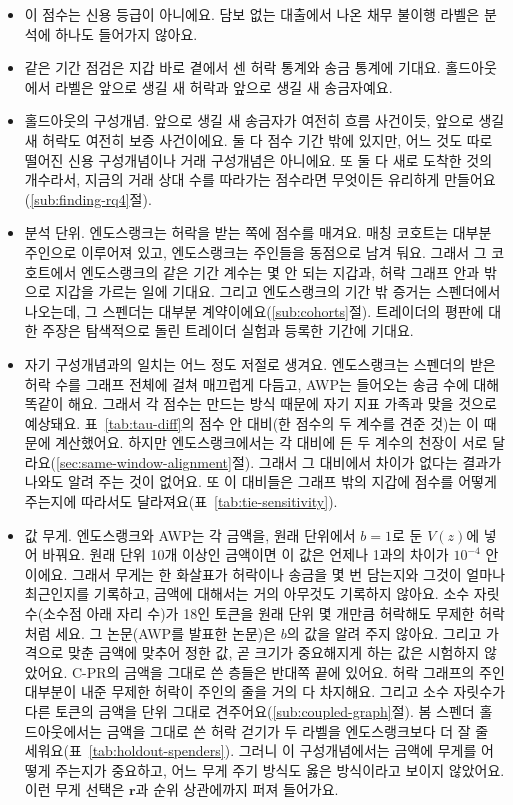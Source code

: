 \begin{itemize}
\item 이 점수는 신용 등급이 아니에요. 담보 없는 대출에서 나온 채무 불이행 라벨은 분석에 하나도 들어가지 않아요.
\item 같은 기간 점검은 지갑 바로 곁에서 센 허락 통계와 송금 통계에 기대요. 홀드아웃에서 라벨은 앞으로 생길 새 허락과 앞으로 생길 새 송금자예요.
\item 홀드아웃의 구성개념. 앞으로 생길 새 송금자가 여전히 흐름 사건이듯, 앞으로 생길 새 허락도 여전히 보증 사건이에요. 둘 다 점수 기간 밖에 있지만, 어느 것도 따로 떨어진 신용 구성개념이나 거래 구성개념은 아니에요. 또 둘 다 새로 도착한 것의 개수라서, 지금의 거래 상대 수를 따라가는 점수라면 무엇이든 유리하게 만들어요(\ref{sub:finding-rq4}절).
\item 분석 단위. 엔도스랭크는 허락을 받는 쪽에 점수를 매겨요. 매칭 코호트는 대부분 주인으로 이루어져 있고, 엔도스랭크는 주인들을 동점으로 남겨 둬요. 그래서 그 코호트에서 엔도스랭크의 같은 기간 계수는 몇 안 되는 지갑과, 허락 그래프 안과 밖으로 지갑을 가르는 일에 기대요. 그리고 엔도스랭크의 기간 밖 증거는 스펜더에서 나오는데, 그 스펜더는 대부분 계약이에요(\ref{sub:cohorts}절). 트레이더의 평판에 대한 주장은 탐색적으로 돌린 트레이더 실험과 등록한 기간에 기대요.
\item 자기 구성개념과의 일치는 어느 정도 저절로 생겨요. 엔도스랭크는 스펜더의 받은 허락 수를 그래프 전체에 걸쳐 매끄럽게 다듬고, AWP는 들어오는 송금 수에 대해 똑같이 해요. 그래서 각 점수는 만드는 방식 때문에 자기 지표 가족과 맞을 것으로 예상돼요. 표~\ref{tab:tau-diff}의 점수 안 대비(한 점수의 두 계수를 견준 것)는 이 때문에 계산했어요. 하지만 엔도스랭크에서는 각 대비에 든 두 계수의 천장이 서로 달라요(\ref{sec:same-window-alignment}절). 그래서 그 대비에서 차이가 없다는 결과가 나와도 알려 주는 것이 없어요. 또 이 대비들은 그래프 밖의 지갑에 점수를 어떻게 주는지에 따라서도 달라져요(표~\ref{tab:tie-sensitivity}).
\item 값 무게. 엔도스랭크와 AWP는 각 금액을, 원래 단위에서 $b=1$로 둔 $V(z)$에 넣어 바꿔요. 원래 단위 10개 이상인 금액이면 이 값은 언제나 1과의 차이가 $10^{-4}$ 안이에요. 그래서 무게는 한 화살표가 허락이나 송금을 몇 번 담는지와 그것이 얼마나 최근인지를 기록하고, 금액에 대해서는 거의 아무것도 기록하지 않아요. 소수 자릿수(소수점 아래 자리 수)가 18인 토큰을 원래 단위 몇 개만큼 허락해도 무제한 허락처럼 세요. 그 논문(AWP를 발표한 논문)은 $b$의 값을 알려 주지 않아요. 그리고 가격으로 맞춘 금액에 맞추어 정한 값, 곧 크기가 중요해지게 하는 값은 시험하지 않았어요. C-PR의 금액을 그대로 쓴 층들은 반대쪽 끝에 있어요. 허락 그래프의 주인 대부분이 내준 무제한 허락이 주인의 줄을 거의 다 차지해요. 그리고 소수 자릿수가 다른 토큰의 금액을 단위 그대로 견주어요(\ref{sub:coupled-graph}절). 봄 스펜더 홀드아웃에서는 금액을 그대로 쓴 허락 걷기가 두 라벨을 엔도스랭크보다 더 잘 줄 세워요(표~\ref{tab:holdout-spenders}). 그러니 이 구성개념에서는 금액에 무게를 어떻게 주는지가 중요하고, 어느 무게 주기 방식도 옳은 방식이라고 보이지 않았어요. 이런 무게 선택은 $\mathbf{r}$과 순위 상관에까지 퍼져 들어가요.
\end{itemize}

